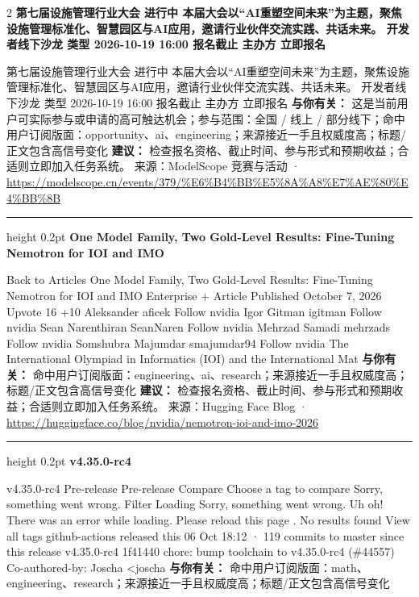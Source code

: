 \documentclass[10.5pt]{ctexart}
\begin{document}
\begin{multicols}{2}
{\large\bfseries 第七届设施管理行业大会 进行中 本届大会以“AI重塑空间未来”为主题，聚焦设施管理标准化、智慧园区与AI应用，邀请行业伙伴交流实践、共话未来。 开发者线下沙龙 类型 2026-10-19 16:00 报名截止 主办方 立即报名}\par
第七届设施管理行业大会 进行中 本届大会以“AI重塑空间未来”为主题，聚焦设施管理标准化、智慧园区与AI应用，邀请行业伙伴交流实践、共话未来。 开发者线下沙龙 类型 2026-10-19 16:00 报名截止 主办方 立即报名
\textbf{与你有关：} 这是当前用户可实际参与或申请的高可触达机会；参与范围：全国 / 线上 / 部分线下；命中用户订阅版面：opportunity、ai、engineering；来源接近一手且权威度高；标题/正文包含高信号变化
\textbf{建议：} 检查报名资格、截止时间、参与形式和预期收益；合适则立即加入任务系统。
{\footnotesize\color{ormuted} 来源：ModelScope 竞赛与活动 · \url{https://modelscope.cn/events/379/%E6%B4%BB%E5%8A%A8%E7%AE%80%E4%BB%8B}}
\vspace{2mm}
\hrule height 0.2pt
\vspace{2mm}
{\large\bfseries One Model Family, Two Gold-Level Results: Fine-Tuning Nemotron for IOI and IMO}\par
Back to Articles One Model Family, Two Gold-Level Results: Fine-Tuning Nemotron for IOI and IMO Enterprise + Article Published October 7, 2026 Upvote 16 +10 Aleksander aficek Follow nvidia Igor Gitman igitman Follow nvidia Sean Narenthiran SeanNaren Follow nvidia Mehrzad Samadi mehrzads Follow nvidia Somshubra Majumdar smajumdar94 Follow nvidia The International Olympiad in Informatics (IOI) and the International Mat
\textbf{与你有关：} 命中用户订阅版面：engineering、ai、research；来源接近一手且权威度高；标题/正文包含高信号变化
\textbf{建议：} 检查报名资格、截止时间、参与形式和预期收益；合适则立即加入任务系统。
{\footnotesize\color{ormuted} 来源：Hugging Face Blog · \url{https://huggingface.co/blog/nvidia/nemotron-ioi-and-imo-2026}}
\vspace{2mm}
\hrule height 0.2pt
\vspace{2mm}
{\large\bfseries v4.35.0-rc4}\par
v4.35.0-rc4 Pre-release Pre-release Compare Choose a tag to compare Sorry, something went wrong. Filter Loading Sorry, something went wrong. Uh oh! There was an error while loading. Please reload this page . No results found View all tags github-actions released this 06 Oct 18:12 · 119 commits to master since this release v4.35.0-rc4 1f41440 chore: bump toolchain to v4.35.0-rc4 (\#44557) Co-authored-by: Joscha <joscha
\textbf{与你有关：} 命中用户订阅版面：math、engineering、research；来源接近一手且权威度高；标题/正文包含高信号变化

\end{multicols}
\end{document}
